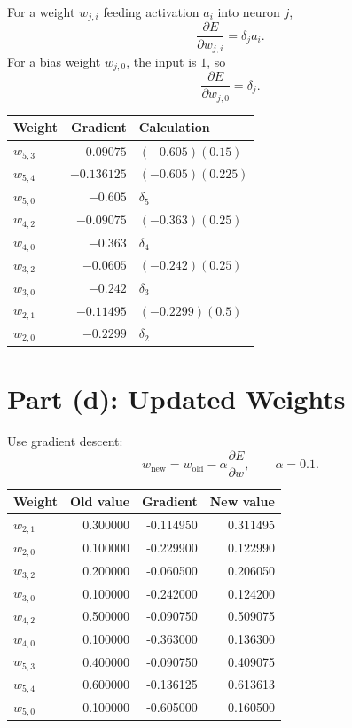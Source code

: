 \documentclass[11pt]{article}
\begin{document}
For a weight \(w_{j,i}\) feeding activation \(a_i\) into neuron \(j\),
\[
    \frac{\partial E}{\partial w_{j,i}}
    =
    \delta_j a_i.
\]
For a bias weight \(w_{j,0}\), the input is \(1\), so
\[
    \frac{\partial E}{\partial w_{j,0}}
    =
    \delta_j.
\]

\begin{center}
\begin{tabular}{lrl}
\toprule
Weight & Gradient & Calculation \\
\midrule
\(w_{5,3}\) & \(-0.09075\) & \((-0.605)(0.15)\) \\
\(w_{5,4}\) & \(-0.136125\) & \((-0.605)(0.225)\) \\
\(w_{5,0}\) & \(-0.605\) & \(\delta_5\) \\
\(w_{4,2}\) & \(-0.09075\) & \((-0.363)(0.25)\) \\
\(w_{4,0}\) & \(-0.363\) & \(\delta_4\) \\
\(w_{3,2}\) & \(-0.0605\) & \((-0.242)(0.25)\) \\
\(w_{3,0}\) & \(-0.242\) & \(\delta_3\) \\
\(w_{2,1}\) & \(-0.11495\) & \((-0.2299)(0.5)\) \\
\(w_{2,0}\) & \(-0.2299\) & \(\delta_2\) \\
\bottomrule
\end{tabular}
\end{center}

\section*{Part (d): Updated Weights}

Use gradient descent:
\[
    w_{\text{new}}
    =
    w_{\text{old}}-\alpha\frac{\partial E}{\partial w},
    \qquad \alpha=0.1.
\]

\begin{center}
\begin{tabular}{lrrr}
\toprule
Weight & Old value & Gradient & New value \\
\midrule
\(w_{2,1}\) & 0.300000 & -0.114950 & 0.311495 \\
\(w_{2,0}\) & 0.100000 & -0.229900 & 0.122990 \\
\(w_{3,2}\) & 0.200000 & -0.060500 & 0.206050 \\
\(w_{3,0}\) & 0.100000 & -0.242000 & 0.124200 \\
\(w_{4,2}\) & 0.500000 & -0.090750 & 0.509075 \\
\(w_{4,0}\) & 0.100000 & -0.363000 & 0.136300 \\
\(w_{5,3}\) & 0.400000 & -0.090750 & 0.409075 \\
\(w_{5,4}\) & 0.600000 & -0.136125 & 0.613613 \\
\(w_{5,0}\) & 0.100000 & -0.605000 & 0.160500 \\
\bottomrule
\end{tabular}
\end{center}
\end{document}
